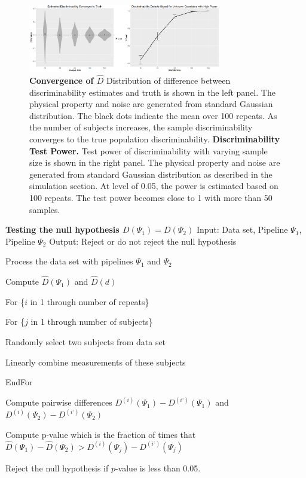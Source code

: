 \documentclass[simplex.tex]{subfiles}
\begin{document}
\begin{figure}[h!]
\begin{cframed}
\centering
\includegraphics[width=0.75\textwidth]{./figs/discriminability1.png}
\caption{
{\bf Convergence of $\hat D$}
Distribution of difference between
discriminability estimates and truth is
shown in the left panel. The physical
property and noise are generated from
standard Gaussian distribution. The black
dots indicate the mean over 100 repeats. As
the number of subjects increases, the
sample discriminability converges to the
true population discriminability.  {\bf
Discriminability Test Power.} Test power
of discriminability with varying sample
size is shown in the right panel. The
physical property and noise are generated
from standard Gaussian distribution as
described in the simulation section. At
level of 0.05, the power is estimated based
on  100 repeats. The test power becomes close
to 1 with more than 50 samples.}
\label{fig:dis1}
\end{cframed}
\end{figure}

{\bf Testing the null hypothesis $D(\Psi_1) = D(\Psi_2)$}
Input: Data set, Pipeline $\Psi_1$, Pipeline $\Psi_2$
Output: Reject or do not reject the null hypothesis


\begin{compactenum}
\item Process the data set with pipelines $\Psi_1$ and $\Psi_2$
\item Compute $\hat D(\Psi_1)$ and $\hat D(d)$  
\item For \{$i$ in 1 through number of repeats\} 
  \begin{compactenum}
  \item For \{$j$ in 1 through number of subjects\} 
    \begin{compactenum}
    \item Randomly select two subjects from data set 
    \item Linearly combine measurements of these subjects
    \end{compactenum}
  \end{compactenum}
\item EndFor
\item Compute pairwise differences $D^{(i)}(\Psi_1) - D^{(i’)}(\Psi_1)$ and $D^{(i)}(\Psi_2) - D^{(i’)}(\Psi_2)$
\item Compute p-value which is the fraction of times that $\hat D(\Psi_1)−\hat D(\Psi_2) > D^{(i)}(\Psi_j) − D^{(i‘)}(\Psi_j)$
\item Reject the null hypothesis if $p$-value is less than 0.05.
\end{compactenum}
\end{document}
